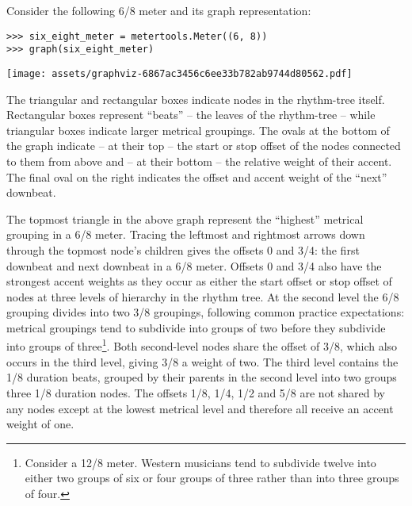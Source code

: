 Consider the following 6/8 meter and its graph representation:

\begin{comment}
<abjad>
six_eight_meter = metertools.Meter((6, 8))
graph(six_eight_meter)
</abjad>
\end{comment}

\begin{singlespacing}
\vspace{-0.5\baselineskip}
\begin{lstlisting}
>>> six_eight_meter = metertools.Meter((6, 8))
>>> graph(six_eight_meter)
\end{lstlisting}
\texttt{[image: assets/graphviz-6867ac3456c6ee33b782ab9744d80562.pdf]}
\end{singlespacing}

\noindent The triangular and rectangular boxes indicate nodes in the
rhythm-tree itself. Rectangular boxes represent \enquote{beats} -- the leaves
of the rhythm-tree -- while triangular boxes indicate larger metrical
groupings. The ovals at the bottom of the graph indicate -- at their top -- the
start or stop offset of the nodes connected to them from above and -- at their
bottom -- the relative weight of their accent. The final oval on the right
indicates the offset and accent weight of the \enquote{next} downbeat.

The topmost triangle in the above graph represent the \enquote{highest}
metrical grouping in a 6/8 meter. Tracing the leftmost and rightmost arrows
down through the topmost node's children gives the offsets 0 and 3/4: the first
downbeat and next downbeat in a 6/8 meter. Offsets 0 and 3/4 also have the
strongest accent weights as they occur as either the start offset or stop
offset of nodes at three levels of hierarchy in the rhythm tree. At the second
level the 6/8 grouping divides into two 3/8 groupings, following common
practice expectations: metrical groupings tend to subdivide into groups of two
before they subdivide into groups of three\footnote{Consider a 12/8 meter.
Western musicians tend to subdivide twelve into either two groups of six or
four groups of three rather than into three groups of four.}. Both second-level
nodes share the offset of 3/8, which also occurs in the third level, giving 3/8
a weight of two. The third level contains the 1/8 duration beats, grouped by
their parents in the second level into two groups three 1/8 duration nodes. The
offsets 1/8, 1/4, 1/2 and 5/8 are not shared by any nodes except at the lowest
metrical level and therefore all receive an accent weight of one.

